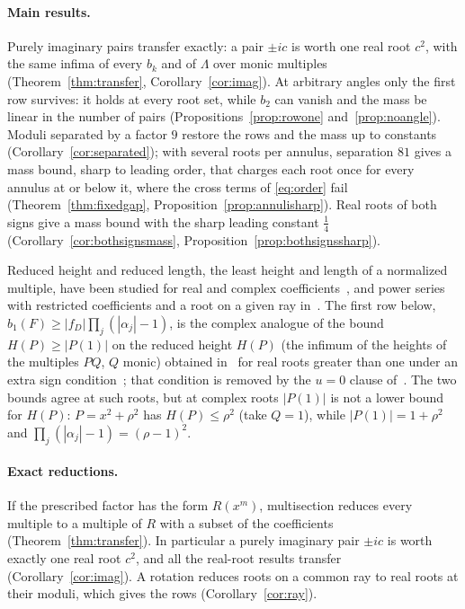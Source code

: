 \documentclass[11pt]{article}
\begin{document}
\paragraph{Main results.}  Purely imaginary pairs transfer exactly: a pair
$\pm ic$ is worth one real root $c^2$, with the same infima of every $b_k$
and of $\Lambda$ over monic multiples (Theorem~\ref{thm:transfer},
Corollary~\ref{cor:imag}).  At arbitrary angles only the first row survives:
it holds at every root set, while $b_2$ can vanish and the mass be linear in
the number of pairs (Propositions~\ref{prop:rowone} and~\ref{prop:noangle}).
Moduli separated by a factor $9$ restore the rows and the mass up to
constants (Corollary~\ref{cor:separated}); with several roots per annulus,
separation $81$ gives a mass bound, sharp to leading order, that charges
each root once for every annulus at or below it, where the cross terms of
\eqref{eq:order} fail (Theorem~\ref{thm:fixedgap},
Proposition~\ref{prop:annulisharp}).  Real roots of both signs give a mass
bound with the sharp leading constant $\frac14$
(Corollary~\ref{cor:bothsignsmass}, Proposition~\ref{prop:bothsignssharp}).

Reduced height and reduced length, the least height and length of a
normalized multiple, have been studied for real and complex
coefficients~\cite{dj,schinzel-complex}, and power series with restricted
coefficients and a root on a given ray in~\cite{bbbp-ray}.  The first row
below, $b_1(F)\ge|f_D|\prod_j(|\alpha_j|-1)$, is the complex analogue of the
bound $H(P)\ge|P(1)|$ on the reduced height $H(P)$ (the infimum of the
heights of the multiples $PQ$, $Q$ monic) obtained in~\cite{dj} for real roots
greater than one under an extra sign condition~\cite[p.~333]{dj}; that
condition is removed by the $u=0$ clause of~\cite[Theorem~3.2]{coefficient-mass}.
The two bounds agree at such roots, but at complex
roots $|P(1)|$ is not a lower bound for $H(P)$: $P=x^2+\rho^2$ has $H(P)\le\rho^2$ (take $Q=1$),
while $|P(1)|=1+\rho^2$ and $\prod_j(|\alpha_j|-1)=(\rho-1)^2$.

\paragraph{Exact reductions.}  If the prescribed factor has the form
$R(x^m)$, multisection reduces every multiple to a multiple of $R$ with a
subset of the coefficients (Theorem~\ref{thm:transfer}).  In particular a
purely imaginary pair $\pm ic$ is worth exactly one real root $c^2$, and all
the real-root results transfer (Corollary~\ref{cor:imag}).  A rotation
reduces roots on a common ray to real roots at their moduli, which gives the
rows (Corollary~\ref{cor:ray}).
\end{document}
